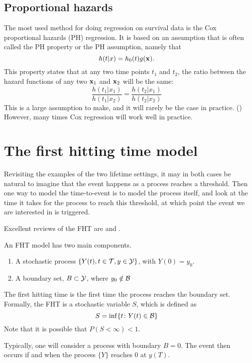 \subsection{Proportional hazards}
The most used method for doing regression on survival data is the Cox proportional hazards (PH) regression. It is based on an assumption that is often called the PH property or the PH assumption, namely that
\begin{equation}
    h(t|x)=h_0(t)g(\mathbf{x}).
\end{equation}
This property states that at any two time points $t_1$ and $t_2$, the ratio between the hazard functions of any two $\mathbf{x}_1$ and $\mathbf{x}_2$ will be the same:
\begin{equation}
    \frac{h(t_1|x_1)}{h(t_1|x_2)}=\frac{h(t_2|x_1)}{h(t_2|x_2)}
\end{equation}
This is a large assumption to make, and it will rarely be the case in practice. (\cite{lee2010}) However, many times Cox regression will work well in practice.

\section{The first hitting time model}\label{sec:fht}
Revisiting the examples of the two lifetime settings, it may in both cases be natural to imagine that the event happens as a process reaches a threshold. Then one way to model the time-to-event is to model the process itself, and look at the time it takes for the process to reach this threshold, at which point the event we are interested in is triggered.

Excellent reviews of the FHT are \cite{lee2006} and \cite{caroni2017}.

An FHT model has two main components.
\begin{enumerate}
    \item A stochastic process $\{Y(t), t\in\mathcal{T},y\in\mathcal{Y}\}$, with $Y(0)=y_0$.
    \item A boundary set, $B\subset \mathcal{Y}$, where $y_0\notin\mathcal{B}$
\end{enumerate}
The first hitting time is the first time the process reaches the boundary set. Formally, the FHT is a stochastic variable $S$, which is defined as
\[
    S = \inf\{t\colon Y(t)\in\mathcal{B}\}
\]
Note that it is possible that $P(S<\infty)<1$.

Typically, one will consider a process with boundary $B=0$. The event then occurs if and when the process $\{Y\}$ reaches 0 at $y(T)$.

